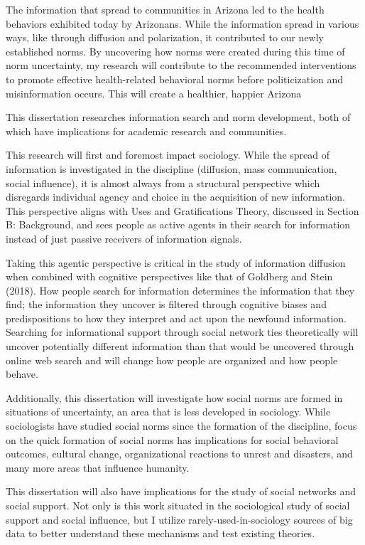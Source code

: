 The information that spread to communities in Arizona led to the health
behaviors exhibited today by Arizonans. While the information spread in
various ways, like through diffusion and polarization, it contributed to
our newly established norms. By uncovering how norms were created during
this time of norm uncertainty, my research will contribute to the recommended interventions to promote effective health-related behavioral norms before politicization and
misinformation occurs. This will create a healthier, happier Arizona

This dissertation researches information search and norm development,
both of which have implications for academic research and communities.


This research will first and foremost impact sociology. While the spread
of information is investigated in the discipline (diffusion, mass
communication, social influence), it is almost always from a structural
perspective which disregards individual agency and choice in the
acquisition of new information. This perspective aligns with Uses and
Gratifications Theory, discussed in Section B: Background, and sees
people as active agents in their search for information instead of just
passive receivers of information signals.

Taking this agentic perspective is critical in the study of information
diffusion when combined with cognitive perspectives like that of
Goldberg and Stein (2018). How people search for information determines
the information that they find; the information they uncover is filtered
through cognitive biases and predispositions to how they interpret and
act upon the newfound information. Searching for informational support
through social network ties theoretically will uncover potentially
different information than that would be uncovered through online web
search and will change how people are organized and how people behave.

Additionally, this dissertation will investigate how social norms are
formed in situations of uncertainty, an area that is less developed in
sociology. While sociologists have studied social norms since the
formation of the discipline, focus on the quick formation of social
norms has implications for social behavioral outcomes, cultural change,
organizational reactions to unrest and disasters, and many more areas
that influence humanity.

This dissertation will also have implications for the study of social
networks and social support. Not only is this work situated in the
sociological study of social support and social influence, but I utilize
rarely-used-in-sociology sources of big data to better understand these
mechanisms and test existing theories.

